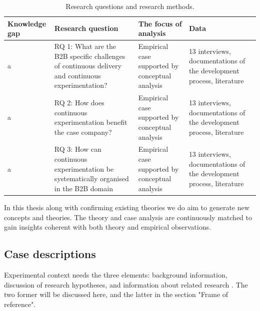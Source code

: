 \documentclass[english]{tktltiki2}
\theoremstyle{definition}
\theoremstyle{remark}
\begin{document}
\begin{center}
\begin{table}[htb]
    \begin{tabular}{ | l | p{5cm} | l | p{3cm} |}
    \hline
    Knowledge gap & Research question & The focus of analysis & Data \\ \hline
    a & RQ 1: What are the B2B specific challenges of continuous delivery and continuous experimentation? & Empirical case supported by conceptual analysis & 13 interviews, documentations of the development process, literature \\ \hline
    a & RQ 2: How does continuous experimentation benefit the case company? & Empirical case supported by conceptual analysis & 13 interviews, documentations of the development process, literature \\ \hline
    a & RQ 3: How can continuous experimentation be systematically organised in the B2B domain & Empirical case supported by conceptual analysis & 13 interviews, documentations of the development process, literature \\ \hline
    \end{tabular}
    \caption{Research questions and research methods.}
    \end{table}
\end{center}

In this thesis along with confirming existing theories we do aim to generate new concepts and theories. The theory and case analysis are continuously matched to gain insights coherent with both theory and empirical observations. 

\subsection{Case descriptions} %

Experimental context needs the three elements: background information, discussion of research hypotheses, and information about related research \cite{kitchenham2002preliminary}. The two former will be discussed here, and the latter in the section "Frame of reference".
\end{document}
